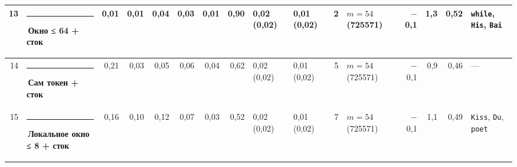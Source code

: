 \documentclass[10pt]{article}
\begin{document}
\begin{minipage}{\linewidth}
\begin{center}
{\begin{tabular}{|r|l|r|r|r|r|r|r|l|l|r|l|r|r|r|l|}
13 & \textcolor[HTML]{EDA100}{\rule{0.62em}{0.62em}}\,\textbf{Окно ≤ 64 + сток} & 0,01 & 0,01 & 0,04 & 0,03 & 0,01 & 0,90 & 0,02 (0,02) & 0,01 (0,02) & 2 & $m{=}54$ (725571) & $-$0,1 & 1,3 & 0,52 & \texttt{\textvisiblespace{}while}, \texttt{\textvisiblespace{}His}, \texttt{\textvisiblespace{}Bai} \\ \hline
14 & \textcolor[HTML]{2A78D6}{\rule{0.62em}{0.62em}}\,\textbf{Сам токен + сток} & 0,21 & 0,03 & 0,05 & 0,06 & 0,04 & 0,62 & 0,02 (0,02) & 0,01 (0,02) & 5 & $m{=}54$ (725571) & $-$0,1 & 0,9 & 0,46 & — \\ \hline
15 & \textcolor[HTML]{1BAF7A}{\rule{0.62em}{0.62em}}\,\textbf{Локальное окно ≤ 8 + сток} & 0,16 & 0,10 & 0,12 & 0,07 & 0,03 & 0,52 & 0,02 (0,02) & 0,01 (0,02) & 7 & $m{=}54$ (725571) & $-$0,1 & 1,1 & 0,49 & \texttt{\textvisiblespace{}Kiss}, \texttt{\textvisiblespace{}Du}, \texttt{\textvisiblespace{}poet} \\ \hline
\hline\end{tabular}}\end{center}
\end{minipage}
\par\vspace{0.4em}
\end{document}
